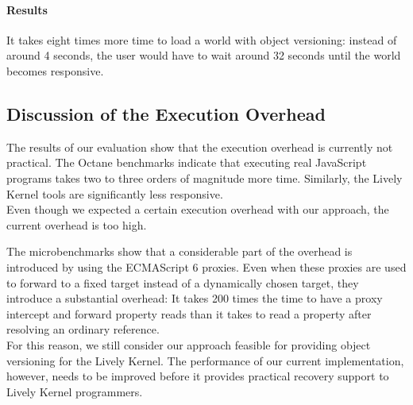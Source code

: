\paragraph{Results}
It takes eight times more time to load a world with object versioning: instead of around 4 seconds, the user would have to wait around 32 seconds until the world becomes responsive.




\subsection{Discussion of the Execution Overhead}

The results of our evaluation show that the execution overhead is currently not practical.
The Octane benchmarks indicate that executing real JavaScript programs takes two to three orders of magnitude more time.
Similarly, the Lively Kernel tools are significantly less responsive.\\
Even though we expected a certain execution overhead with our approach, the current overhead is too high.

The microbenchmarks show that a considerable part of the overhead is introduced by using the ECMAScript 6 proxies.
Even when these proxies are used to forward to a fixed target instead of a dynamically chosen target, they introduce a substantial overhead:
It takes 200 times the time to have a proxy intercept and forward property reads than it takes to read a property after resolving an ordinary reference.\\
For this reason, we still consider our approach feasible for providing object versioning for the Lively Kernel.
The performance of our current implementation, however, needs to be improved before it provides practical recovery support to Lively Kernel programmers.









    





